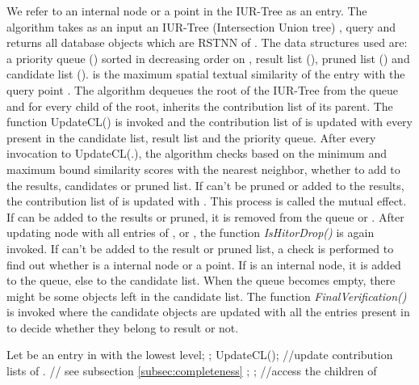 \documentclass[prodmode,letterpaper]{acmsmall}
\newcommand{\rstknn}{RSTNN\xspace}
\begin{document}
We refer to an internal node or a point in the IUR-Tree as an entry. The algorithm takes as an input an IUR-Tree (Intersection Union tree) ,
query  and returns all database objects which are \rstknn of . The data structures used are: a priority queue () sorted
in decreasing order on , result list (), pruned list () and
candidate list ().  is the maximum spatial textual similarity of the entry  with the query point . The
algorithm dequeues the root of the IUR-Tree from the queue and for every child  of the root,  inherits the contribution list of its parent. The function UpdateCL() is invoked and the contribution list of  is updated with every  present in the candidate list, result list and the priority queue. After every invocation to UpdateCL(.), the algorithm checks based on the minimum and maximum bound similarity scores with the 
nearest neighbor, whether to add  to the results,
candidates or pruned list. If  can't be pruned or added to the results, the contribution list of  is updated with . This process is called the mutual effect. If  can be added to the results or pruned, it is removed from the queue or . After updating node  with all entries of ,  or , the function \textit{IsHitorDrop()} is again invoked. If  can't be added to the result or pruned list, a check is performed to find out whether  is a internal node or a point. If  is an
internal node, it is added to the queue, else to the candidate list.
When the queue becomes empty, there might be some objects left in the
candidate list. The function \textit{FinalVerification()} is invoked where the candidate objects are updated with all the entries present in  to decide whether they
belong to result or not.
\begin{spacing}{0.8}
\begin{algorithm}[tp]
\begin{algorithmic}[1]
\While{}
	\State Let  be an entry in  with the lowest level;
	\State ;
		\State UpdateCL(); //update contribution lists of .
		 // see subsection \ref{subsec:completeness}
			\State ;
		\EndIf
	\EndFor
		\State ; //access the children of  	
	\EndFor
\EndWhile
\EndFunction
\end{algorithmic}
\end{algorithm}
\end{spacing}
\end{document}
